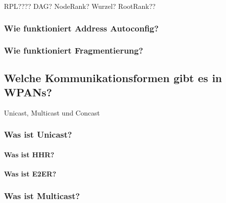 		RPL???? DAG? NodeRank? Wurzel? RootRank??
		\subsubsection{Wie funktioniert Address Autoconfig?}
		\subsubsection{Wie funktioniert Fragmentierung?}
	
	\subsection{Welche Kommunikationsformen gibt es in WPANs?}
		Unicast, Multicast und Concast
		\subsubsection{Was ist Unicast?}
			\paragraph{Was ist HHR?}
			\paragraph{Was ist E2ER?}
		\subsubsection{Was ist Multicast?}
